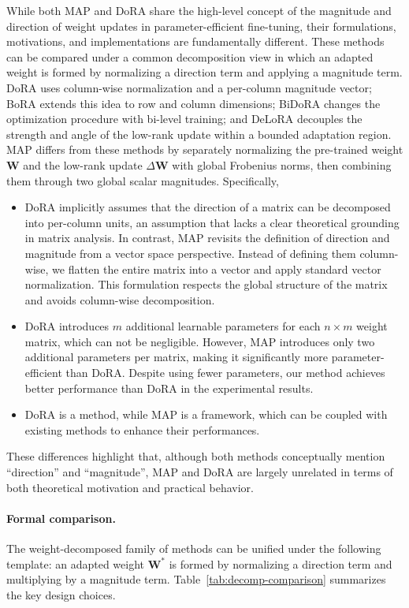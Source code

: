 While both MAP and DoRA share the high-level concept of the magnitude and direction of weight updates in parameter-efficient fine-tuning, their formulations, motivations, and implementations are fundamentally different.
These methods can be compared under a common decomposition view in which an adapted weight is formed by normalizing a direction term and applying a magnitude term.
DoRA uses column-wise normalization and a per-column magnitude vector; BoRA extends this idea to row and column dimensions; BiDoRA changes the optimization procedure with bi-level training; and DeLoRA decouples the strength and angle of the low-rank update within a bounded adaptation region.
MAP differs from these methods by separately normalizing the pre-trained weight $\mathbf{W}$ and the low-rank update $\Delta\mathbf{W}$ with global Frobenius norms, then combining them through two global scalar magnitudes.
Specifically, 
\begin{itemize}
    \item DoRA implicitly assumes that the direction of a matrix can be decomposed into per-column units, an assumption that lacks a clear theoretical grounding in matrix analysis. 
    In contrast, MAP revisits the definition of direction and magnitude from a vector space perspective.
    Instead of defining them column-wise, we flatten the entire matrix into a vector and apply standard vector normalization.
    This formulation respects the global structure of the matrix and avoids column-wise decomposition. 
    \item DoRA introduces $m$ additional learnable parameters for each $n \times m$ weight matrix, which can not be negligible. However, MAP introduces only two additional parameters per matrix, making it significantly more parameter-efficient than DoRA. 
    Despite using fewer parameters, our method achieves better performance than DoRA in the experimental results.
    \item DoRA is a method, while MAP is a framework, which can be coupled with existing methods to enhance their performances.
\end{itemize}

These differences highlight that, although both methods conceptually mention ``direction'' and ``magnitude'', MAP and DoRA are largely unrelated in terms of both theoretical motivation and practical behavior.

\paragraph{Formal comparison.}
The weight-decomposed family of methods can be unified under the following template: an adapted weight $\mathbf{W}^*$ is formed by normalizing a direction term and multiplying by a magnitude term.
Table~\ref{tab:decomp-comparison} summarizes the key design choices.

